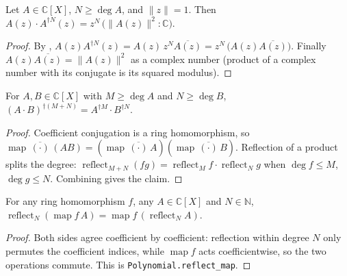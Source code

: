 \begin{lemma}
    \label{lem:conj-recip-prod}
    \leanok
    Let $A \in \mathbb{C}[X]$, $N \ge \deg A$, and $\|z\| = 1$. Then
    $A(z)\cdot A^{\dagger N}(z) = z^{N}\,\bigl(\|A(z)\|^2 : \mathbb{C}\bigr)$.
\end{lemma}
\begin{proof}
    By ,
    $A(z)A^{\dagger N}(z) = A(z)\,z^{N}\overline{A(z)}
    = z^{N}\,\bigl(A(z)\overline{A(z)}\bigr)$.
    Finally $A(z)\overline{A(z)} = \|A(z)\|^2$ as a complex number
    (product of a complex number with its conjugate is its squared modulus).
\end{proof}

\begin{lemma}
    \label{lem:conjrecip-mul}
    \leanok
    For $A, B \in \mathbb{C}[X]$ with $M \ge \deg A$ and $N \ge \deg B$,
    $(A\cdot B)^{\dagger (M+N)} = A^{\dagger M}\cdot B^{\dagger N}$.
\end{lemma}
\begin{proof}
    Coefficient conjugation is a ring homomorphism, so
    $\operatorname{map}\,\overline{(\cdot)}\,(AB)
    = (\operatorname{map}\,\overline{(\cdot)}\,A)(\operatorname{map}\,\overline{(\cdot)}\,B)$.
    Reflection of a product splits the degree:
    $\operatorname{reflect}_{M+N}(fg) = \operatorname{reflect}_M f \cdot
    \operatorname{reflect}_N g$ when $\deg f \le M$, $\deg g \le N$. Combining
    gives the claim.
\end{proof}

\begin{lemma}
    \label{lem:reflect-map-comm}
    \leanok
    For any ring homomorphism $f$, any $A \in \mathbb{C}[X]$ and $N \in \mathbb{N}$,
    $\operatorname{reflect}_N(\operatorname{map} f\,A)
    = \operatorname{map} f\,(\operatorname{reflect}_N A)$.
\end{lemma}
\begin{proof}
    Both sides agree coefficient by coefficient: reflection within degree $N$
    only permutes the coefficient indices, while $\operatorname{map} f$ acts
    coefficientwise, so the two operations commute. This is
    \texttt{Polynomial.reflect\_map}.
\end{proof}

